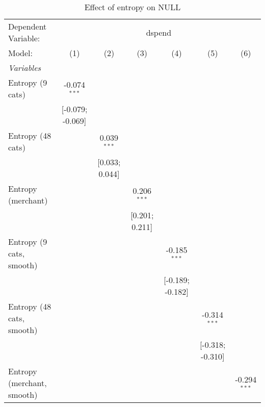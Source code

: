 
\begin{table}[htbp]
   \centering
   \tiny
   \begin{threeparttable}[b]
      \caption{\label{tab:reg_dspend_nolag} Effect of entropy on NULL}
      \begin{tabular}{lcccccc}
         \tabularnewline \midrule \midrule
         Dependent Variable: & \multicolumn{6}{c}{dspend}\\
         Model:                     & (1)              & (2)            & (3)             & (4)              & (5)              & (6)\\  
         \midrule
         \emph{Variables}\\
         Entropy (9 cats)           & -0.074$^{***}$   &                &                 &                  &                  &   \\   
                                    & [-0.079; -0.069] &                &                 &                  &                  &   \\   
         Entropy (48 cats)          &                  & 0.039$^{***}$  &                 &                  &                  &   \\   
                                    &                  & [0.033; 0.044] &                 &                  &                  &   \\   
         Entropy (merchant)         &                  &                & 0.206$^{***}$   &                  &                  &   \\   
                                    &                  &                & [0.201; 0.211]  &                  &                  &   \\   
         Entropy (9 cats, smooth)   &                  &                &                 & -0.185$^{***}$   &                  &   \\   
                                    &                  &                &                 & [-0.189; -0.182] &                  &   \\   
         Entropy (48 cats, smooth)  &                  &                &                 &                  & -0.314$^{***}$   &   \\   
                                    &                  &                &                 &                  & [-0.318; -0.310] &   \\   
         Entropy (merchant, smooth) &                  &                &                 &                  &                  & -0.294$^{***}$\\   

\end{tabular}
\end{threeparttable}
\end{table}
